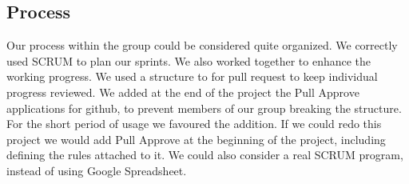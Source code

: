 

\subsection{Process}
Our process within the group could be considered quite organized. We correctly used SCRUM to plan our sprints. We also worked together to enhance the working progress. We used a structure to for pull request to keep individual progress reviewed. We added at the end of the project the Pull Approve applications for github, to prevent members of our group breaking the structure. For the short period of usage we favoured the addition. If we could redo this project we would add Pull Approve at the beginning of the project, including defining the rules attached to it. We could also consider a real SCRUM program, instead of using Google Spreadsheet.





